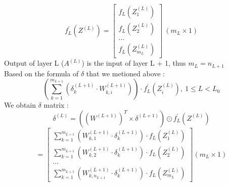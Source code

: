 \documentclass{article}
\begin{document}
        \[
            f^{\prime}_{L}\left(Z^{(L)}\right) = 
            \begin{bmatrix}
                f_L\left(Z^{(L)}_1\right)  \\ 
                f_L\left(Z^{(L)}_2\right) \\ 
                \hdots \\ 
                f_L\left(Z^{(L)}_{m_{L}}\right)
            \end{bmatrix} \ (m_{L} \times 1)
        \]
    Output of layer L ($A^{(L)}$) is the input of layer L + 1, thus $m_L = n_{L+1}$
    \\
    Based on the formula of $\delta$ that we metioned above :
    \[
        \left(
            \sum_{k = 1}^{m_{L+1}}\left(
                \delta^{(L + 1)}_k \cdot W^{(L + 1)}_{k, i}
            \right) 
        \right) \cdot f_{L}^{\prime}\left(Z^{(L)}_i\right), \ 1 \leq L < L_0
    \]
    We obtain $\delta$ matrix : 
    \[
        \delta^{(L)} = \left(\left(W^{(L + 1)}\right)^T \times \delta^{(L + 1)} \right) \odot
        f^{\prime}_{L}\left(Z^{(L)}\right)
    \]
    \[
        =\begin{bmatrix}
            \sum_{k = 1}^{m_{L+1}}\left(
                W^{(L + 1)}_{k, 1} \cdot \delta^{(L + 1)}_k 
            \right) \cdot  f_L\left(Z^{(L)}_1\right) \\
            \sum_{k = 1}^{m_{L+1}}\left(
                W^{(L + 1)}_{k, 2} \cdot \delta^{(L + 1)}_k  
            \right) \cdot f_L\left(Z^{(L)}_2\right) \\
            \hdots \\
            \sum_{k = 1}^{m_{L+1}}\left(
                W^{(L + 1)}_{k, {n_{L+1}}} \cdot \delta^{(L + 1)}_k  
            \right) \cdot f_L\left(Z^{(L)}_{m_{L}}\right) 
        \end{bmatrix} (m_{L} \times 1)
    \]
\end{document}
